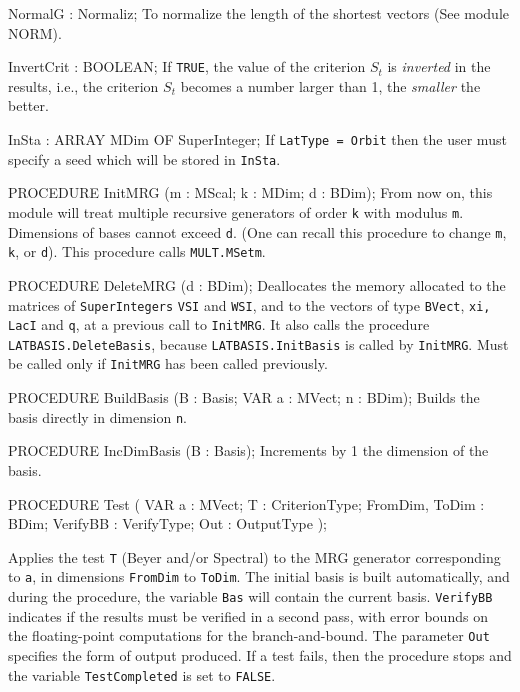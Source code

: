   NormalG : Normaliz;
\endcode
 \tabb To normalize the length of the shortest vectors (See module NORM).
 \endtabb
\code

   InvertCrit : BOOLEAN;
\endcode
 \tabb  If {\tt TRUE}, the value of the criterion $S_t$ is {\em inverted\/} 
  in the results, i.e., the criterion $S_t$ becomes a number larger than 1,
  the {\em smaller\/} the better.
 \endtabb
\code

   InSta : ARRAY MDim OF SuperInteger;    
\endcode
 \tabb If {\tt LatType = Orbit} then the user must specify a seed which
  will be stored in {\tt InSta}. 
 \endtabb
\code

PROCEDURE InitMRG (m : MScal;  k : MDim;  d : BDim);
\endcode
  \tab  From now on, this module will treat multiple recursive generators
   of order {\tt k} with modulus {\tt m}. 
   Dimensions of bases cannot exceed {\tt d}.
   (One can recall this procedure to change {\tt m}, {\tt k}, or {\tt d}).
   This procedure calls {\tt MULT.MSetm}.
\endtab
\code

PROCEDURE DeleteMRG (d : BDim);
\endcode
  \tab Deallocates the memory allocated to the matrices of {\tt SuperIntegers}
  {\tt VSI} and {\tt WSI}, and to the vectors of type {\tt BVect}, 
  {\tt xi, LacI}
  and {\tt q}, at a previous call to {\tt InitMRG}. It also calls 
  the procedure {\tt LATBASIS.DeleteBasis}, because {\tt LATBASIS.InitBasis} is
  called by {\tt InitMRG}. Must be called only if {\tt InitMRG} has been called
  previously.
\endtab
\code

PROCEDURE BuildBasis (B : Basis;   VAR a : MVect;   n : BDim);
\endcode
   \tab  Builds the basis directly in dimension {\tt n}.
   \endtab
\code

PROCEDURE IncDimBasis (B : Basis);
\endcode
   \tab  Increments by 1 the dimension of the basis.
   \endtab
\code

PROCEDURE Test
   ( VAR a          : MVect;
     T              : CriterionType;
     FromDim, ToDim : BDim;
     VerifyBB       : VerifyType;
     Out            : OutputType );

\endcode
 \tab  Applies the test {\tt T} (Beyer and/or Spectral)
   to the MRG generator corresponding to {\tt a}, in dimensions
   {\tt FromDim} to {\tt ToDim}.
   The initial basis is built automatically, and during the procedure,
   the variable {\tt Bas} will contain the current basis.
   {\tt VerifyBB} indicates if
   the results must be verified in a second pass, with error bounds
   on the floating-point computations for the branch-and-bound.
   The parameter {\tt Out} specifies the form of output produced.
   If a test fails, then the procedure stops and the variable
   {\tt TestCompleted} is set to {\tt FALSE}.
 \endtab
\code

